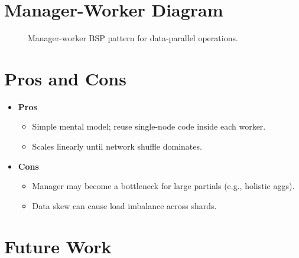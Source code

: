 \documentclass[11pt]{article}
\begin{document}
\section{Manager-Worker Diagram}

\begin{figure}[h]
  \centering
  \caption{Manager-worker BSP pattern for data-parallel operations.}
\end{figure}

\section{Pros and Cons}

\begin{itemize}[itemsep=0pt]
  \item \textbf{Pros}
    \begin{itemize}[itemsep=0pt]
      \item Simple mental model; reuse single-node code inside each worker.
      \item Scales linearly until network shuffle dominates.
    \end{itemize}
  \item \textbf{Cons}
    \begin{itemize}[itemsep=0pt]
      \item Manager may become a bottleneck for large partials (e.g., holistic aggs).
      \item Data skew can cause load imbalance across shards.
    \end{itemize}
\end{itemize}

\section{Future Work}
\end{document}
